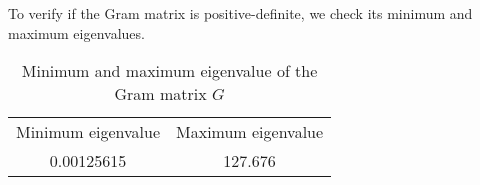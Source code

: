 To verify if the Gram matrix is positive-definite, we check its minimum and maximum eigenvalues.

\begin{table} 
    \begin{tabular}{ c c }
        Minimum eigenvalue & Maximum eigenvalue \\
        0.00125615 & 127.676 \\ 
    \end{tabular} 
    \caption{Minimum and maximum eigenvalue of the Gram matrix $G$} 
\end{table}
